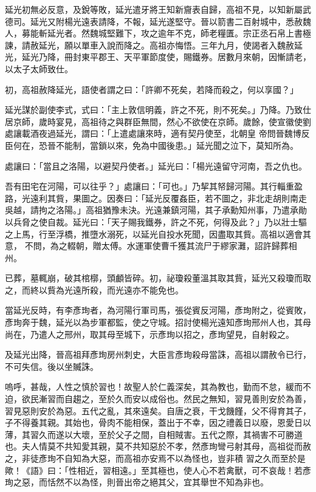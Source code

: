 \begin{pinyinscope}
 延光初無必反意，及銳等敗，延光遣牙將王知新齎表自歸，高祖不見，以知新屬武德司。延光又附楊光遠表請降，不報，延光遂堅守。晉以箭書二百射城中，悉赦魏
 人，募能斬延光者。然魏城堅難下，攻之逾年不克，師老糧匱。宗正丞石帛上書極諫，請赦延光，願以單車入說而降之。高祖亦悔悟。三年九月，使謁者入魏赦延光，延光乃降，冊封東平郡王、天平軍節度使，賜鐵券。居數月來朝，因慚請老，以太子太師致仕。



 初，高祖赦降延光，語使者謂之曰：「許卿不死矣，若降而殺之，何以享國？」



 延光謀於副使李式，式曰：「主上敦信明義，許之不死，則不死矣。」乃降。乃致仕居京師，歲時宴見，高祖待之與群臣無間，然心不欲使在京師。歲餘，使宣徽使劉處讓載酒夜過延光，謂曰：「上遣處讓來時，適有契丹使至，北朝皇
 帝問晉魏博反臣何在，恐晉不能制，當鎖以來，免為中國後患。」延光聞之泣下，莫知所為。



 處讓曰：「當且之洛陽，以避契丹使者。」延光曰：「楊光遠留守河南，吾之仇也。



 吾有田宅在河陽，可以往乎？」處讓曰：「可也。」乃挈其帑歸河陽。其行輜重盈路，光遠利其貲，果圖之。因奏曰：「延光反覆姦臣，若不圖之，非北走胡則南走吳越，請拘之洛陽。」高祖猶豫未決。光遠兼鎮河陽，其子承勳知州事，乃遣承勛以兵脅之使自裁。延光曰：「天子賜我鐵券，許之不死，何得及此？」乃以壯士驅之上馬，行至浮橋，推墮水溺死，以延光自投水死聞，因盡取其貲。高祖以適會其意，
 不問，為之輟朝，贈太傅。水運軍使曹千獲其流尸于繆家灘，詔許歸葬相州。



 已葬，墓輒崩，破其棺槨，頭顱皆碎。初，祕瓊殺董溫其取其貲，延光又殺瓊而取之，而終以貲為光遠所殺，而光遠亦不能免也。



 當延光反時，有李彥珣者，為河陽行軍司馬，張從賓反河陽，彥珣附之，從賓敗，彥珣奔于魏，延光以為步軍都監，使之守城。招討使楊光遠知彥珣邢州人也，其母尚在，乃遣人之邢州，取其母至城下，示彥珣以招之，彥珣望見，自射殺之。



 及延光出降，晉高祖拜彥珣房州刺史，大臣言彥珣殺母當誅，高祖以謂赦令已行，不可失信。後以坐贓誅。



 嗚呼，甚哉，人性之慎於習也！故聖人於仁義深矣，其為教也，勤而不怠，緩而不迫，欲民漸習而自趨之，至於久而安以成俗也。然民之無知，習見善則安於為善，習見惡則安於為惡。五代之亂，其來遠矣。自唐之衰，干戈饑饉，父不得育其子，子不得養其親。其始也，骨肉不能相保，蓋出于不幸，因之禮義日以廢，恩愛日以薄，其習久而遂以大壞，至於父子之間，自相賊害。五代之際，其禍害不可勝道也。夫人情莫不共知愛其親，莫不共知惡於不孝，然彥珣彎弓射其母，高祖從而赦之，非徒彥珣不自知為大惡，而高祖亦安焉不以為怪也，豈非積
 習之久而至於是歟！《語》曰：「性相近，習相遠。」至其極也，使人心不若禽獸，可不哀哉！若彥珣之惡，而恬然不以為怪，則晉出帝之絕其父，宜其舉世不知為非也。




\end{pinyinscope}
